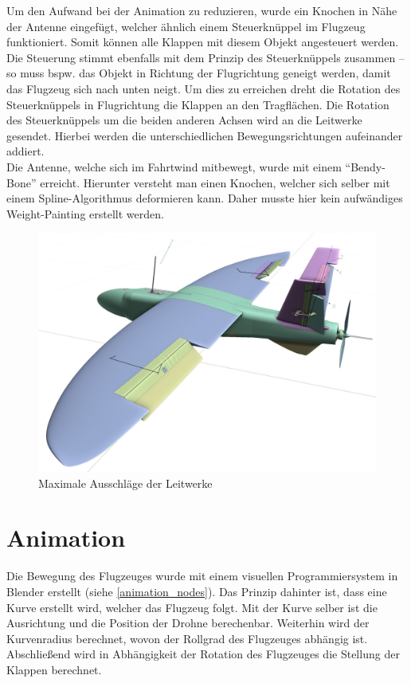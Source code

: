 Um den Aufwand bei der Animation zu reduzieren, wurde ein Knochen in Nähe der Antenne eingefügt, welcher ähnlich einem Steuerknüppel im Flugzeug funktioniert. Somit können alle Klappen mit diesem Objekt angesteuert werden. Die Steuerung stimmt ebenfalls mit dem Prinzip des Steuerknüppels zusammen -- so muss bspw. das Objekt in Richtung der Flugrichtung geneigt werden, damit das Flugzeug sich nach unten neigt. Um dies zu erreichen dreht die Rotation des Steuerknüppels in Flugrichtung die Klappen an den Tragflächen. Die Rotation des Steuerknüppels um die beiden anderen Achsen wird an die Leitwerke gesendet. Hierbei werden die unterschiedlichen Bewegungsrichtungen aufeinander addiert. \\
Die Antenne, welche sich im Fahrtwind mitbewegt, wurde mit einem ``Bendy-Bone'' erreicht. Hierunter versteht man einen Knochen, welcher sich selber mit einem Spline-Algorithmus deformieren kann. Daher musste hier kein aufwändiges Weight-Painting erstellt werden.

\begin{figure}[H]
\begin{center}
\includegraphics[width=\textwidth]{gfx/prod/plane/plane8.jpg}
\caption{Maximale Ausschläge der Leitwerke}
\label{rigged_plane}
\end{center}
\end{figure}

\section{Animation}

Die Bewegung des Flugzeuges wurde mit einem visuellen Programmiersystem in Blender erstellt (siehe \autoref{animation_nodes}). Das Prinzip dahinter ist, dass eine Kurve erstellt wird, welcher das Flugzeug folgt. Mit der Kurve selber ist die Ausrichtung und die Position der Drohne berechenbar. Weiterhin wird der Kurvenradius berechnet, wovon der Rollgrad des Flugzeuges abhängig ist. Abschließend wird in Abhängigkeit der Rotation des Flugzeuges die Stellung der Klappen berechnet.

